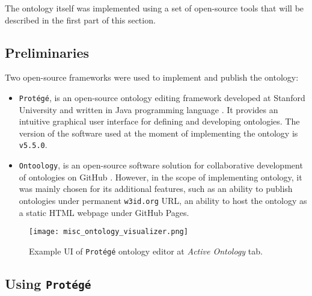 The ontology itself was implemented using a set of open-source tools that will be described in the first part of this section. 

\subsection{Preliminaries}

Two open-source frameworks were used to implement and publish the \lpas{} ontology:
\begin{itemize}
    \item \texttt{Protégé}, is an open-source ontology editing framework developed at Stanford University and written in Java programming language \cite{protege}. It provides an intuitive graphical user interface for defining and developing ontologies. The version of the software used at the moment of implementing the ontology is \texttt{v5.5.0}.
    \item \texttt{Ontoology}, is an open-source software solution for collaborative development of ontologies on GitHub \cite{ontoology}. However, in the scope of implementing \lpas{} ontology, it was mainly chosen for its additional features, such as an ability to publish ontologies under permanent \texttt{w3id.org} URL, an ability to host the ontology as a static HTML webpage under GitHub Pages. 
\end{itemize}

\begin{figure}[h]
\centering
\texttt{[image: misc\_ontology\_visualizer.png]}
\caption{Example UI of \texttt{Protégé} ontology editor at \textit{Active Ontology} tab.}
\label{fig:misc_ontology_visualizer}
\end{figure}

\subsection{Using \texttt{Protégé}}

